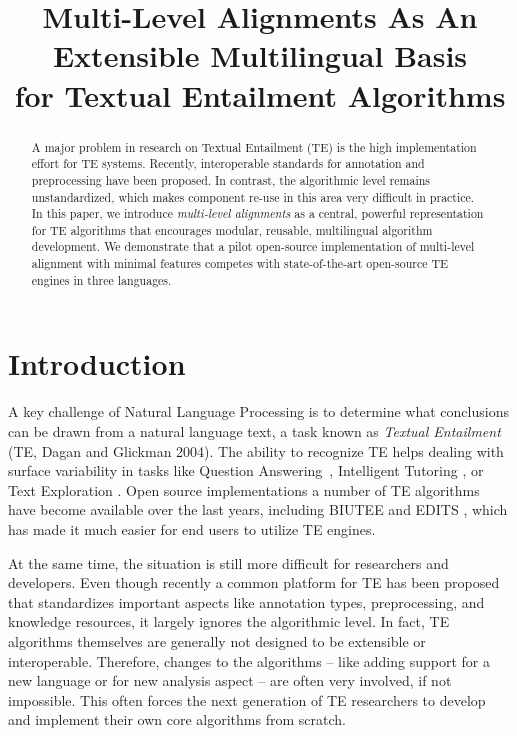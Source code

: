 \documentclass[11pt,letterpaper]{article}
\title{Multi-Level Alignments As An Extensible Multilingual Basis \\ for
  Textual Entailment Algorithms}
\date{}
\begin{document}
\maketitle
\begin{abstract}
  A major problem in research on Textual Entailment (TE) is the high
  implementation effort for TE systems. Recently, interoperable
  standards for annotation and preprocessing have been proposed. In
  contrast, the algorithmic level remains unstandardized, which
  makes component re-use in this area very difficult in
  practice.
%
%
%
  In this paper, we introduce {\em multi-level alignments} as a
  central, powerful representation for TE algorithms that encourages
  modular, reusable, multilingual algorithm development.
  We demonstrate that a pilot open-source implementation of
  multi-level alignment with minimal features competes with
  state-of-the-art open-source TE engines in three languages.
\end{abstract}

\section{Introduction}
A key challenge of Natural Language Processing is to determine what
conclusions can be drawn from a natural language text, a task known as
\textit{Textual Entailment} (TE, Dagan and Glickman
2004).\nocite{dagan04:_probab_textual_entail} The ability to recognize
TE helps dealing with surface variability in tasks like Question
Answering~\cite{harabagiu-hickl:2006:COLACL}, Intelligent Tutoring
\cite{nielsen09:_recog_entail_in_intel_tutor_system}, or Text
Exploration \cite{berant2012learning}. Open source implementations a
number of TE algorithms have become available over the last years,
including BIUTEE \cite{Stern:2012} and EDITS \cite{Kouylekov:2010},
which has made it much easier for end users to utilize TE engines.

At the same time, the situation is still more difficult for
researchers and developers. Even though recently a common platform for
TE has been proposed \cite{EOP-arch} that standardizes important
aspects like annotation types, preprocessing, and knowledge resources,
it largely ignores the algorithmic level. In fact, TE algorithms
themselves are generally not designed to be extensible or
interoperable. Therefore, changes to the algorithms -- like adding
support for a new language or for new analysis aspect -- are often
very involved, if not impossible. This often forces the next
generation of TE researchers to develop and implement their own core
algorithms from scratch.
\end{document}
